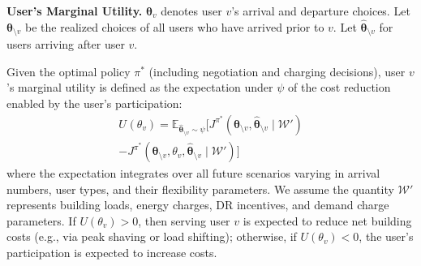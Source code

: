 






\noindent\textbf{User's Marginal Utility.}
$\boldsymbol\theta_v$ denotes user $v$'s arrival and departure choices. Let $\boldsymbol{\theta}_{\setminus v}$ be the realized choices of all users who have arrived prior to $v$. Let \(\boldsymbol{\hat{\theta}}_{\setminus v}\) for users arriving after user \(v\).


Given the optimal policy $\pi^{*}$ (including negotiation and charging decisions), user $v$'s marginal utility is defined as the expectation under $\psi$ of the cost reduction enabled by the user's participation:
\begin{equation}\label{eq:user_utility}
\begin{split}
U^{}(\theta_v) = \mathbb{E}_{\boldsymbol{\hat{\theta}}_{\setminus v} \sim \psi}
    \Big[
    J^{\pi^{*}}(\boldsymbol{\theta}_{\setminus v}, \boldsymbol{\hat{\theta}}_{\setminus v} \mid \mathcal{W}')\\
    - J^{\pi^{*}}(\boldsymbol{\theta}_{\setminus v}, \theta_v, \boldsymbol{\hat{\theta}}_{\setminus v} \mid \mathcal{W}')
    \Big]
\end{split}
\end{equation}  
where the expectation integrates over all future scenarios varying in arrival numbers, user types, and their flexibility parameters. We assume the quantity \(\mathcal{W}'\) represents building loads, energy charges, DR incentives, and demand charge parameters.
If \(U(\theta_v) > 0\), then serving user \(v\) is expected to reduce net building costs (e.g., via peak shaving or load shifting); otherwise, if \(U(\theta_v)<0\), the user’s participation is expected to increase costs.





